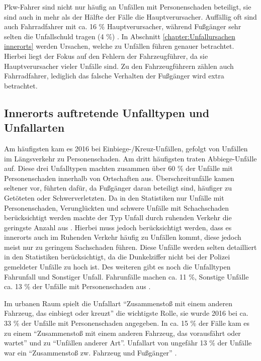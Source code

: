 Pkw-Fahrer sind nicht nur häufig an Unfällen mit Personenschaden beteiligt, sie sind auch in mehr als der Hälfte der Fälle die Hauptverursacher. Auffällig oft sind auch Fahrradfahrer mit ca. 16 \% Hauptverursacher, während Fußgänger sehr selten die Unfallschuld tragen (4 \%) \parencite[S. 105]{StatistischesBundesamt.2018c}. In Abschnitt \ref{chapter:Unfallursachen innerorts} werden Ursachen, welche zu Unfällen führen genauer betrachtet. Hierbei liegt der Fokus auf den Fehlern der Fahrzeugführer, da sie Hauptverursacher vieler Unfälle sind. Zu den Fahrzeugführern zählen auch Fahrradfahrer, lediglich das falsche Verhalten der Fußgänger wird extra betrachtet.

\subsection{Innerorts auftretende Unfalltypen und Unfallarten }
Am häufigsten kam es 2016 bei Einbiege-/Kreuz-Unfällen, gefolgt von Unfällen im Längsverkehr zu Personenschaden. Am dritt häufigsten traten Abbiege-Unfälle auf. Diese drei Unfalltypen machten zusammen über 60 \% der Unfälle mit Personenschaden innerhalb von Ortschaften aus. Überschreitunfälle kamen seltener vor, führten dafür, da Fußgänger daran beteiligt sind, häufiger zu Getöteten oder Schwerverletzten. Da in den Statistiken nur Unfälle mit Personenschaden, Verunglückten und schwere Unfälle mit Schachschaden berücksichtigt werden machte der Typ Unfall durch ruhenden Verkehr die geringste Anzahl aus \parencite[S. 68]{StatistischesBundesamt.2017}. Hierbei muss jedoch berücksichtigt werden, dass es innerorts auch im Ruhenden Verkehr häufig zu Unfällen kommt, diese jedoch meist nur zu geringem Sachschaden führen. Diese Unfälle werden selten detailliert in den Statistiken berücksichtigt, da die Dunkelziffer nicht bei der Polizei gemeldeter Unfälle zu hoch ist. Des weiteren gibt es noch die Unfalltypen Fahrunfall und Sonstiger Unfall. Fahrunfälle machen ca. 11 \%, Sonstige Unfälle ca. 13 \% der Unfälle mit Personenschaden aus \parencite[S. 68]{StatistischesBundesamt.2017}.

Im urbanen Raum spielt die Unfallart \enquote{Zusammenstoß mit einem anderen Fahrzeug, das einbiegt oder kreuzt} die wichtigste Rolle, sie wurde 2016 bei ca. 33 \% der Unfälle mit Personenschaden angegeben. In ca. 15 \% der Fälle kam es zu einem \enquote{Zusammenstoß mit einem anderen Fahrzeug, das vorausfährt oder wartet} und zu \enquote{Unfällen anderer Art}. Unfallart von ungefähr 13 \% der Unfälle war ein \enquote{Zusammenstoß zw. Fahrzeug und Fußgänger} \parencite[S. 74]{StatistischesBundesamt.2017}.


